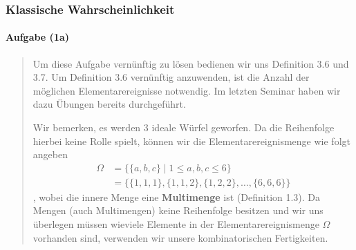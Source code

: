 \documentclass[
]{article}
\author{}
\date{}
\begin{document}
\subsubsection{Klassische
Wahrscheinlichkeit}\label{klassische-wahrscheinlichkeit}

\paragraph{Aufgabe (1a)}\label{aufgabe-1a}

\begin{quote}
Um diese Aufgabe vernünftig zu lösen bedienen wir uns Definition 3.6 und
3.7. Um Definition 3.6 vernünftig anzuwenden, ist die Anzahl der
möglichen Elementarereignisse notwendig. Im letzten Seminar haben wir
dazu Übungen bereits durchgeführt.

Wir bemerken, es werden 3 ideale Würfel geworfen. Da die Reihenfolge
hierbei keine Rolle spielt, können wir die Elementarereignismenge wie
folgt angeben \[\begin{align}
\Omega &= \Big\{ \{a, b, c  \} \;\Big|\; 1 \leq a, b,c \leq 6 \Big\} \\
  &= \Big\{ \{1, 1, 1\}, \{ 1,1,2 \}, \{ 1,2,2 \}, \dots, \{ 6,6,6 \} \}
\end{align}\] , wobei die innere Menge eine \textbf{Multimenge} ist
(Definition 1.3). Da Mengen (auch Multimengen) keine Reihenfolge
besitzen und wir uns überlegen müssen wieviele Elemente in der
Elementarereignismenge \(\Omega\) vorhanden sind, verwenden wir unsere
kombinatorischen Fertigkeiten.


\end{quote}
\end{document}
